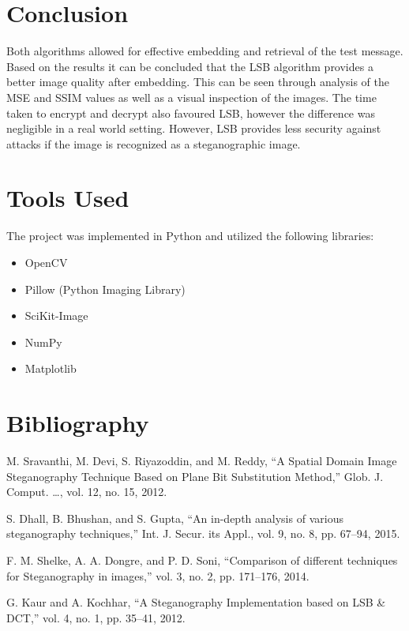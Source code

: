 \documentclass[11pt,letterpaper]{article}
\begin{document}
\section{Conclusion}
Both algorithms allowed for effective embedding and retrieval of the test message. Based on the results it can be concluded that the LSB algorithm provides a better image quality after embedding. This can be seen through analysis of the MSE and SSIM values as well as a visual inspection of the images. The time taken to encrypt and decrypt also favoured LSB, however the difference was negligible in a real world setting. However, LSB provides less security against attacks if the image is recognized as a steganographic image.

\clearpage
\section{Tools Used}
The project was implemented in Python and utilized the following libraries:
\begin{itemize}
\setlength\itemsep{0pt}
\item OpenCV
\item Pillow (Python Imaging Library)
\item SciKit-Image
\item NumPy
\item Matplotlib
\end{itemize}

\section{Bibliography}
\begin{enumerate}[label={[\arabic*]}]
\item M. Sravanthi, M. Devi, S. Riyazoddin, and M. Reddy, “A Spatial Domain Image Steganography Technique Based on Plane Bit Substitution Method,” Glob. J. Comput. …, vol. 12, no. 15, 2012.
\item S. Dhall, B. Bhushan, and S. Gupta, “An in-depth analysis of various steganography techniques,” Int. J. Secur. its Appl., vol. 9, no. 8, pp. 67–94, 2015.
\item F. M. Shelke, A. A. Dongre, and P. D. Soni, “Comparison of different techniques for Steganography in images,” vol. 3, no. 2, pp. 171–176, 2014.
\item G. Kaur and A. Kochhar, “A Steganography Implementation based on LSB \& DCT,” vol. 4, no. 1, pp. 35–41, 2012.
\end{enumerate}
\end{document}

